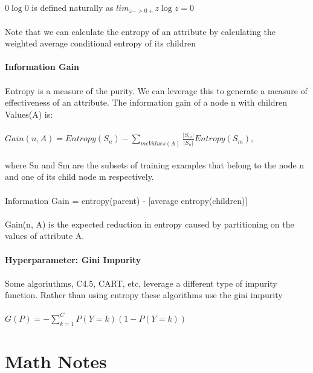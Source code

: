 \documentclass{article}
\begin{document}
\paragraph{}
\(0 \log 0\) is defined naturally as \(lim_{z->0+}z\log z = 0\)\\\\
Note that we can calculate the entropy of an attribute by calculating the weighted average conditional entropy of its children
\paragraph{Information Gain}
\paragraph{}
Entropy is a measure of the purity. We can leverage this to generate a measure of effectiveness of an attribute. The information gain of a node n with children Values(A) is:
\paragraph{}
\(Gain(n, A) = Entropy(S_n) -\sum_{m\epsilon Values(A)} \frac{|S_m|}{|S_n|}Entropy(S_m)\),\\\\
where Sn and Sm are the subsets of training examples that belong to the node n and one of its child node m respectively.\\\\
Information Gain = entropy(parent) - [average entropy(children)]\\\\
Gain(n, A) is the expected reduction in entropy caused by partitioning on the values of attribute A.
\paragraph{Hyperparameter: Gini Impurity}
\paragraph{}
Some algoriuthms, C4.5, CART, etc, leverage a different type of impurity function. Rather than using entropy these algorithms use the gini impurity
\paragraph{}
\(G(P) = -\sum_{k=1}^C P(Y=k)(1-P(Y=k))\)

\section{Math Notes}
\end{document}
